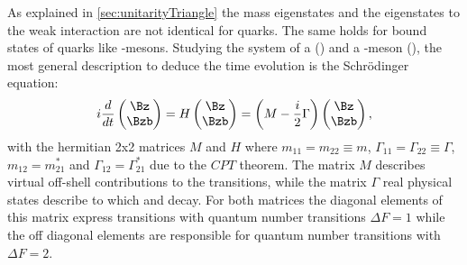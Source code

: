 As explained in \cref{sec:unitarityTriangle} the mass eigenstates and the eigenstates to the weak interaction are not identical for
quarks. The same holds for bound states of quarks like \B-mesons. Studying the system of a \Bz (\bquarkbar\dquark) and a \Bzb-meson
(\bquark\dquarkbar), the most general description to deduce the time evolution is the Schrödinger equation:
\begin{equation}
i\frac{d}{dt}\begin{pmatrix} \Bz \\ \Bzb \end{pmatrix} = H \begin{pmatrix} \Bz \\ \Bzb \end{pmatrix}
=\left(M-\frac{i}{2}\Gamma\right)\begin{pmatrix} \Bz \\ \Bzb \end{pmatrix},
\end{equation}
with the hermitian 2x2 matrices $M$ and $H$ where $m_{11}=m_{22}\equiv m$, $\Gamma_{11}=\Gamma_{22}\equiv\Gamma$, $m_{12}=m_{21}^\ast$ and $\Gamma_{12}=\Gamma_{21}^\ast$ due to the $CPT$ theorem.
The matrix $M$ describes virtual off-shell contributions to the transitions, while the matrix $\Gamma$ real physical states describe to which \Bz and \Bzb decay.
For both matrices the diagonal elements of this matrix express transitions with quantum number transitions $\Delta F=1$ while the off diagonal elements are responsible for quantum number transitions with $\Delta F=2$.



